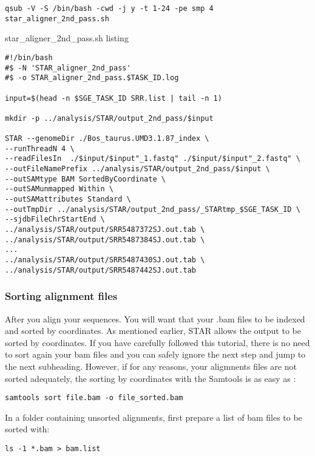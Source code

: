 \begin{verbatim}
qsub -V -S /bin/bash -cwd -j y -t 1-24 -pe smp 4 star_aligner_2nd_pass.sh
\end{verbatim}

\noindent star\_aligner\_2nd\_pass.sh listing
\begin{verbatim}
#!/bin/bash
#$ -N 'STAR_aligner_2nd_pass'
#$ -o STAR_aligner_2nd_pass.$TASK_ID.log

input=$(head -n $SGE_TASK_ID SRR.list | tail -n 1)

mkdir -p ../analysis/STAR/output_2nd_pass/$input

STAR --genomeDir ./Bos_taurus.UMD3.1.87_index \
--runThreadN 4 \
--readFilesIn  ./$input/$input"_1.fastq" ./$input/$input"_2.fastq" \
--outFileNamePrefix ../analysis/STAR/output_2nd_pass/$input \
--outSAMtype BAM SortedByCoordinate \
--outSAMunmapped Within \
--outSAMattributes Standard \
--outTmpDir ../analysis/STAR/output_2nd_pass/_STARtmp_$SGE_TASK_ID \
--sjdbFileChrStartEnd \
../analysis/STAR/output/SRR5487372SJ.out.tab \
../analysis/STAR/output/SRR5487384SJ.out.tab \
...
../analysis/STAR/output/SRR5487430SJ.out.tab \
../analysis/STAR/output/SRR5487442SJ.out.tab
\end{verbatim}



\subsubsection{Sorting alignment files}


After you align your sequences. You will want that your .bam files to be indexed and sorted by coordinates. As mentioned earlier, STAR allows the output to be sorted by coordinates. If you have carefully followed this tutorial, there is no need to sort again your bam files and you can safely ignore the next step and jump to the next subheading. However, if for any reasons, your aligmnents files are not sorted adequately, the sorting by coordinates with the Samtools is as easy as :

\begin{verbatim}
samtools sort file.bam -o file_sorted.bam
\end{verbatim}

In a folder containing unsorted alignments, first prepare a list of bam files to be sorted with:

\begin{verbatim}
ls -1 *.bam > bam.list
\end{verbatim}

